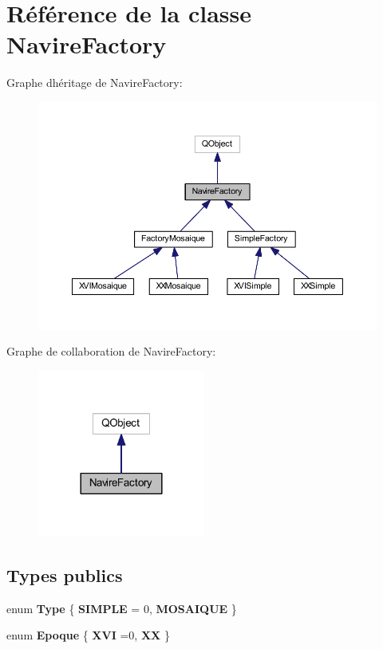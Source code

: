 \hypertarget{class_navire_factory}{}\section{Référence de la classe Navire\+Factory}
\label{class_navire_factory}


Graphe d\textquotesingle{}héritage de Navire\+Factory\+:
\nopagebreak
\begin{figure}[H]
\begin{center}
\leavevmode
\includegraphics[width=350pt]{class_navire_factory__inherit__graph}
\end{center}
\end{figure}


Graphe de collaboration de Navire\+Factory\+:
\nopagebreak
\begin{figure}[H]
\begin{center}
\leavevmode
\includegraphics[width=156pt]{class_navire_factory__coll__graph}
\end{center}
\end{figure}
\subsection*{Types publics}
\begin{DoxyCompactItemize}
\item 
enum {\bfseries Type} \{ {\bfseries S\+I\+M\+P\+LE} = 0, 
{\bfseries M\+O\+S\+A\+I\+Q\+UE}
 \}\hypertarget{class_navire_factory_ae1da32b895ef4e65026775e63846729c}{}\label{class_navire_factory_ae1da32b895ef4e65026775e63846729c}

\item 
enum {\bfseries Epoque} \{ {\bfseries X\+VI} =0, 
{\bfseries XX}
 \}\hypertarget{class_navire_factory_a46348deb2727c1f95b2e52cd162151e4}{}\label{class_navire_factory_a46348deb2727c1f95b2e52cd162151e4}

\end{DoxyCompactItemize}
